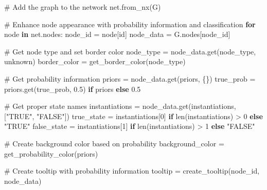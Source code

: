 \documentclass[
  11pt,
  letterpaper,
  openany]{book}
\newenvironment{Shaded}{\begin{snugshade}}{\end{snugshade}}
\newcommand{\BuiltInTok}[1]{\textcolor[rgb]{0.00,0.23,0.31}{#1}}
\newcommand{\CommentTok}[1]{\textcolor[rgb]{0.37,0.37,0.37}{#1}}
\newcommand{\ControlFlowTok}[1]{\textcolor[rgb]{0.00,0.23,0.31}{\textbf{#1}}}
\newcommand{\DecValTok}[1]{\textcolor[rgb]{0.68,0.00,0.00}{#1}}
\newcommand{\FloatTok}[1]{\textcolor[rgb]{0.68,0.00,0.00}{#1}}
\newcommand{\KeywordTok}[1]{\textcolor[rgb]{0.00,0.23,0.31}{\textbf{#1}}}
\newcommand{\NormalTok}[1]{\textcolor[rgb]{0.00,0.23,0.31}{#1}}
\newcommand{\OperatorTok}[1]{\textcolor[rgb]{0.37,0.37,0.37}{#1}}
\newcommand{\StringTok}[1]{\textcolor[rgb]{0.13,0.47,0.30}{#1}}
\begin{document}
\begin{landscape}
\begin{Shaded}
\begin{Highlighting}[]
    \CommentTok{\# Add the graph to the network}
\NormalTok{    net.from\_nx(G)}

    \CommentTok{\# Enhance node appearance with probability information and classification}
    \ControlFlowTok{for}\NormalTok{ node }\KeywordTok{in}\NormalTok{ net.nodes:}
\NormalTok{        node\_id }\OperatorTok{=}\NormalTok{ node[}\StringTok{\textquotesingle{}id\textquotesingle{}}\NormalTok{]}
\NormalTok{        node\_data }\OperatorTok{=}\NormalTok{ G.nodes[node\_id]}

        \CommentTok{\# Get node type and set border color}
\NormalTok{        node\_type }\OperatorTok{=}\NormalTok{ node\_data.get(}\StringTok{\textquotesingle{}node\_type\textquotesingle{}}\NormalTok{, }\StringTok{\textquotesingle{}unknown\textquotesingle{}}\NormalTok{)}
\NormalTok{        border\_color }\OperatorTok{=}\NormalTok{ get\_border\_color(node\_type)}

        \CommentTok{\# Get probability information}
\NormalTok{        priors }\OperatorTok{=}\NormalTok{ node\_data.get(}\StringTok{\textquotesingle{}priors\textquotesingle{}}\NormalTok{, \{\})}
\NormalTok{        true\_prob }\OperatorTok{=}\NormalTok{ priors.get(}\StringTok{\textquotesingle{}true\_prob\textquotesingle{}}\NormalTok{, }\FloatTok{0.5}\NormalTok{) }\ControlFlowTok{if}\NormalTok{ priors }\ControlFlowTok{else} \FloatTok{0.5}

        \CommentTok{\# Get proper state names}
\NormalTok{        instantiations }\OperatorTok{=}\NormalTok{ node\_data.get(}\StringTok{\textquotesingle{}instantiations\textquotesingle{}}\NormalTok{, [}\StringTok{"TRUE"}\NormalTok{, }\StringTok{"FALSE"}\NormalTok{])}
\NormalTok{        true\_state }\OperatorTok{=}\NormalTok{ instantiations[}\DecValTok{0}\NormalTok{] }\ControlFlowTok{if} \BuiltInTok{len}\NormalTok{(instantiations) }\OperatorTok{\textgreater{}} \DecValTok{0} \ControlFlowTok{else} \StringTok{"TRUE"}
\NormalTok{        false\_state }\OperatorTok{=}\NormalTok{ instantiations[}\DecValTok{1}\NormalTok{] }\ControlFlowTok{if} \BuiltInTok{len}\NormalTok{(instantiations) }\OperatorTok{\textgreater{}} \DecValTok{1} \ControlFlowTok{else} \StringTok{"FALSE"}

        \CommentTok{\# Create background color based on probability}
\NormalTok{        background\_color }\OperatorTok{=}\NormalTok{ get\_probability\_color(priors)}

        \CommentTok{\# Create tooltip with probability information}
\NormalTok{        tooltip }\OperatorTok{=}\NormalTok{ create\_tooltip(node\_id, node\_data)}


\end{Highlighting}
\end{Shaded}
\end{landscape}
\end{document}
